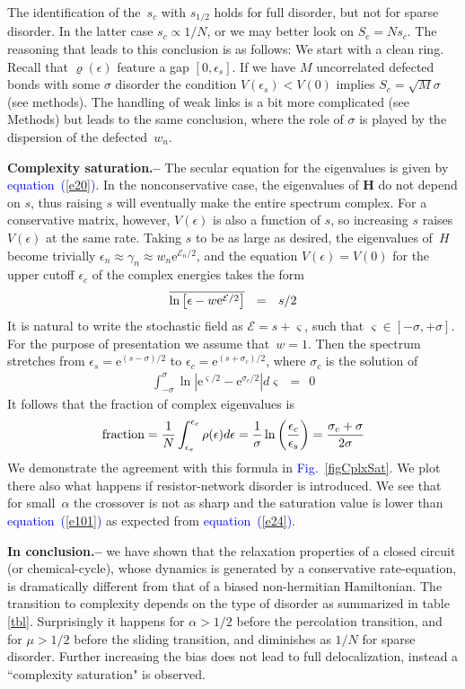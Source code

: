 \documentclass[aps,pre,floats,floatfix,twocolumn]{revtex4}
\newcommand{\eexp}[1]{\mathrm{e}^{#1}}
\newcommand{\be}[1]{\begin{eqnarray}\ifthenelse{#1=-1}{\nonumber}{\ifthenelse{#1=0}{}{\label{e#1}}}}
\newcommand{\beq}{\begin{eqnarray}}
\newcommand{\eeq}{\end{eqnarray}}
\newcommand{\Eq}[1]{\textcolor{blue}{{equation}\!~(\ref{#1})}}
\newcommand{\Fig}[1]{\textcolor{blue}{Fig.}\!\!~\ref{#1}}
\newcommand{\sect}[1]{{\bf #1.-- }}
\begin{document}
The identification of the~$s_c$ with $s_{1/2}$ holds for full disorder, 
but not for sparse disorder. In the latter case ${s_c \propto 1/N}$, 
or we may better look on ${S_c=Ns_c}$. 
The reasoning that leads to this conclusion is as follows: 
We start with a clean ring. Recall that $\varrho(\epsilon)$ 
feature a gap ${[0,\epsilon_s]}$. If we have $M$ uncorrelated defected 
bonds with some $\sigma$ disorder the condition ${V(\epsilon_s)<V(0)}$
implies ${S_c=\sqrt{M}\sigma}$ (see methods).
The handling of weak links is a bit more complicated (see Methods)
but leads to the same conclusion, where the role of $\sigma$ 
is played by the dispersion of the defected~$w_n$.     
  



\sect{Complexity saturation}
%
The secular equation for the eigenvalues is given by \Eq{e20}.
%
In the nonconservative case, the eigenvalues of $\bm{H}$ do not depend on $s$,
thus raising $s$ will eventually make the entire spectrum complex. 
For a conservative matrix, however, $V(\epsilon)$ is also a function of $s$, 
so increasing $s$ raises $V(\epsilon)$  at the same rate.
%
Taking $s$ to be as large as desired, the eigenvalues of~$H$ 
become trivially ${\epsilon_n \approx \gamma_{n} \approx w_n \eexp{\mathcal{E}_n/2}}$, 
and the equation $V(\epsilon)=V(0)$ for the upper cutoff $\epsilon_c$ 
of the complex energies takes the form
%
\be{24}
\overline{\ln\left[ \epsilon - w\eexp{\mathcal{E}/2} \right]} \ \ = \ \ s/2 
\eeq
%
It is natural to write the stochastic field as $\mathcal{E}=s+\varsigma$, 
such that ${\varsigma\in[-\sigma,+\sigma]}$. 
For the purpose of presentation we assume that~$w{=}1$.  
Then the spectrum stretches from $\epsilon_s=\eexp{(s-\sigma)/2}$ 
to ${\epsilon_c=\eexp{(s+\sigma_c)/2}}$,  
where $\sigma_c$ is the solution of
%
\beq
\int_{-\sigma}^{\sigma} \ln \left| \eexp{{\varsigma}/2} - \eexp{\sigma_c /2}\right| d\varsigma  \ \ = \ \ 0 
\eeq
% 
It follows that the fraction of complex eigenvalues is 
%
\be{101}
\text{fraction} 
= \frac{1}{N}\int_{\epsilon_s}^{\epsilon_c} \rho(\epsilon) d\epsilon
= \frac{1}{\sigma}\ln\left( \frac{\epsilon_c}{\epsilon_s} \right) 
= \frac{\sigma_c + \sigma}{2\sigma}
\eeq
%
We demonstrate the agreement with this formula in \Fig{figCplxSat}.
We plot there also what happens if resistor-network disorder is introduced.
We see that for small~$\alpha$ the crossover is not as sharp and 
the saturation value is lower than \Eq{e101} as expected from \Eq{e24}. 


\sect{In conclusion}  
we have shown that the relaxation properties of a closed circuit (or chemical-cycle), 
whose dynamics is generated by a conservative rate-equation,  
is dramatically different from that of a biased non-hermitian Hamiltonian. 
The transition to complexity depends on the type of disorder as summarized in table \ref{tbl}. 
Surprisingly it happens for ${\alpha>1/2}$ before the percolation transition, 
and for ${\mu>1/2}$ before the sliding transition, and diminishes as $1/N$ for sparse disorder.
Further increasing the bias does not lead to full delocalization, instead a ``complexity saturation" is observed.
\end{document}
